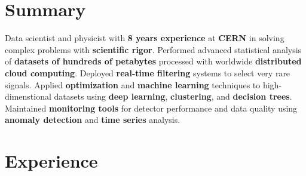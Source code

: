 \documentclass{myfancycv}
\begin{document}
\makeheader
\vspace*{-.35em}

  \vspace*{-0.5em}
\section{Summary}

Data scientist and physicist with {\bf 8 years experience} at {\bf CERN} in solving complex problems with {\bf scientific rigor}.
Performed advanced statistical analysis of {\bf datasets of hundreds of petabytes} processed with worldwide {\bf distributed cloud computing}. Deployed {\bf real-time filtering} systems to select very rare signals. Applied {\bf optimization} and {\bf machine learning} techniques to high-dimenstional datasets using {\bf deep learning}, {\bf clustering}, and {\bf decision trees}. Maintained {\bf monitoring tools} for detector performance and data quality using {\bf anomaly detection} and {\bf time series} analysis.

\section{Experience}
\end{document}
